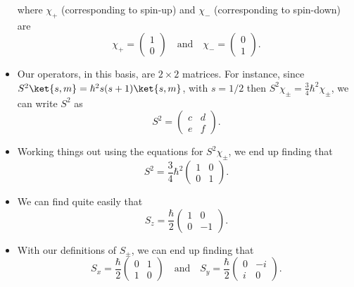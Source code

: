 \begin{itemize}
\begin{equation}
        \end{equation}
        where $\chi_+$ (corresponding to spin-up) and $\chi_-$ (corresponding to spin-down) are
        \begin{equation}
            \chi_+ = \begin{pmatrix}1 \\ 0\end{pmatrix} \quad\mathrm{and}\quad \chi_- = \begin{pmatrix}0 \\ 1\end{pmatrix}.
        \end{equation}
    \item Our operators, in this basis, are $2\times2$ matrices. For instance, since $S^2 \ket{s,m} = \hbar^2 s(s+1) \ket{s,m}$, with $s=1/2$ then $S^2 \chi_{\pm} = \frac{3}{4}\hbar^2 \chi_{\pm}$, we can write $S^2$ as 
        \begin{equation}
            S^2 = \begin{pmatrix}c & d \\ e & f\end{pmatrix}.
        \end{equation}
    \item Working things out using the equations for $S^2\chi_{\pm}$, we end up finding that 
        \begin{equation}
            S^2 = \frac{3}{4}\hbar^2\begin{pmatrix}1 & 0 \\ 0 & 1\end{pmatrix}.
        \end{equation}
    \item We can find quite easily that
        \begin{equation}
            S_z = \frac{\hbar}{2}\begin{pmatrix}1 & 0 \\ 0 & -1\end{pmatrix}.
        \end{equation}
    \item With our definitions of $S_{\pm}$, we can end up finding that
        \begin{equation}
            S_x = \frac{\hbar}{2}\begin{pmatrix}0 & 1 \\ 1 & 0\end{pmatrix} \quad\mathrm{and}\quad S_y = \frac{\hbar}{2}\begin{pmatrix}0 & -i \\ i & 0\end{pmatrix}.

\end{equation}
\end{itemize}
